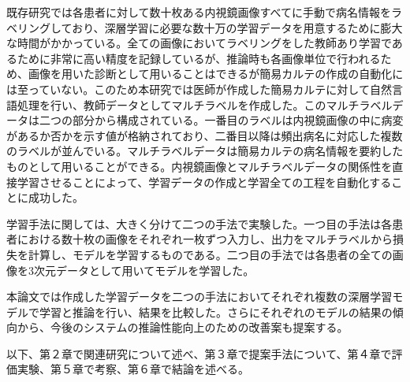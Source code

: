 既存研究では各患者に対して数十枚ある内視鏡画像すべてに手動で病名情報をラベリングしており、深層学習に必要な数十万の学習データを用意するために膨大な時間がかかっている。全ての画像においてラベリングをした教師あり学習であるために非常に高い精度を記録しているが、推論時も各画像単位で行われるため、画像を用いた診断として用いることはできるが簡易カルテの作成の自動化には至っていない。このため本研究では医師が作成した簡易カルテに対して自然言語処理を行い、教師データとしてマルチラベルを作成した。このマルチラベルデータは二つの部分から構成されている。一番目のラベルは内視鏡画像の中に病変があるか否かを示す値が格納されており、二番目以降は頻出病名に対応した複数のラベルが並んでいる。マルチラベルデータは簡易カルテの病名情報を要約したものとして用いることができる。内視鏡画像とマルチラベルデータの関係性を直接学習させることによって、学習データの作成と学習全ての工程を自動化することに成功した。

学習手法に関しては、大きく分けて二つの手法で実験した。一つ目の手法は各患者における数十枚の画像をそれぞれ一枚ずつ入力し、出力をマルチラベルから損失を計算し、モデルを学習するものである。二つ目の手法では各患者の全ての画像を3次元データとして用いてモデルを学習した。

本論文では作成した学習データを二つの手法においてそれぞれ複数の深層学習モデルで学習と推論を行い、結果を比較した。さらにそれぞれのモデルの結果の傾向から、今後のシステムの推論性能向上のための改善案も提案する。

以下、第２章で関連研究について述べ、第３章で提案手法について、第４章で評価実験、第５章で考察、第６章で結論を述べる。
